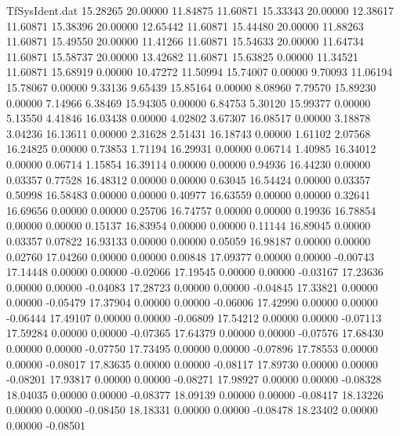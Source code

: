 \begin{filecontents}{TfSysIdent.dat}
  15.28265   20.00000   11.84875   11.60871
  15.33343   20.00000   12.38617   11.60871
  15.38396   20.00000   12.65442   11.60871
  15.44480   20.00000   11.88263   11.60871
  15.49550   20.00000   11.41266   11.60871
  15.54633   20.00000   11.64734   11.60871
  15.58737   20.00000   13.42682   11.60871
  15.63825    0.00000   11.34521   11.60871
  15.68919    0.00000   10.47272   11.50994
  15.74007    0.00000    9.70093   11.06194
  15.78067    0.00000    9.33136    9.65439
  15.85164    0.00000    8.08960    7.79570
  15.89230    0.00000    7.14966    6.38469
  15.94305    0.00000    6.84753    5.30120
  15.99377    0.00000    5.13550    4.41846
  16.03438    0.00000    4.02802    3.67307
  16.08517    0.00000    3.18878    3.04236
  16.13611    0.00000    2.31628    2.51431
  16.18743    0.00000    1.61102    2.07568
  16.24825    0.00000    0.73853    1.71194
  16.29931    0.00000    0.06714    1.40985
  16.34012    0.00000    0.06714    1.15854
  16.39114    0.00000    0.00000    0.94936
  16.44230    0.00000    0.03357    0.77528
  16.48312    0.00000    0.00000    0.63045
  16.54424    0.00000    0.03357    0.50998
  16.58483    0.00000    0.00000    0.40977
  16.63559    0.00000    0.00000    0.32641
  16.69656    0.00000    0.00000    0.25706
  16.74757    0.00000    0.00000    0.19936
  16.78854    0.00000    0.00000    0.15137
  16.83954    0.00000    0.00000    0.11144
  16.89045    0.00000    0.03357    0.07822
  16.93133    0.00000    0.00000    0.05059
  16.98187    0.00000    0.00000    0.02760
  17.04260    0.00000    0.00000    0.00848
  17.09377    0.00000    0.00000   -0.00743
  17.14448    0.00000    0.00000   -0.02066
  17.19545    0.00000    0.00000   -0.03167
  17.23636    0.00000    0.00000   -0.04083
  17.28723    0.00000    0.00000   -0.04845
  17.33821    0.00000    0.00000   -0.05479
  17.37904    0.00000    0.00000   -0.06006
  17.42990    0.00000    0.00000   -0.06444
  17.49107    0.00000    0.00000   -0.06809
  17.54212    0.00000    0.00000   -0.07113
  17.59284    0.00000    0.00000   -0.07365
  17.64379    0.00000    0.00000   -0.07576
  17.68430    0.00000    0.00000   -0.07750
  17.73495    0.00000    0.00000   -0.07896
  17.78553    0.00000    0.00000   -0.08017
  17.83635    0.00000    0.00000   -0.08117
  17.89730    0.00000    0.00000   -0.08201
  17.93817    0.00000    0.00000   -0.08271
  17.98927    0.00000    0.00000   -0.08328
  18.04035    0.00000    0.00000   -0.08377
  18.09139    0.00000    0.00000   -0.08417
  18.13226    0.00000    0.00000   -0.08450
  18.18331    0.00000    0.00000   -0.08478
  18.23402    0.00000    0.00000   -0.08501

\end{filecontents}
